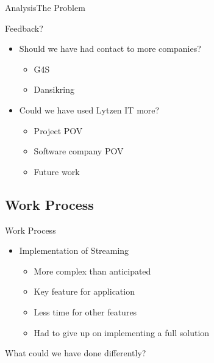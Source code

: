 \begin{frame}{Analysis}{The Problem}
    \begin{block}{Feedback?}
    \begin{itemize}
        \item Should we have had contact to more companies?
        \begin{itemize}
            \item G4S
            \item Dansikring
        \end{itemize}
        \item Could we have used Lytzen IT more?
        \begin{itemize}
            \item Project POV
            \item Software company POV
            \item Future work
        \end{itemize}
    \end{itemize}
    \end{block}
\end{frame}

\subsection{Work Process}

\begin{frame}{Work Process}
    \begin{itemize}
        \item Implementation of Streaming
        \begin{itemize}
            \item More complex than anticipated
            \item Key feature for application
            \item Less time for other features
            \item Had to give up on implementing a full solution
        \end{itemize}
    \end{itemize}
    What could we have done differently?
\end{frame}

